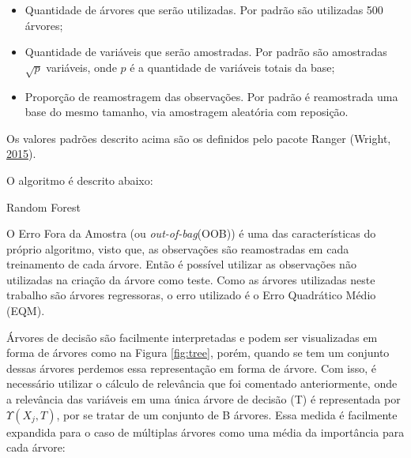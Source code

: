 \documentclass[
	12pt,				%
	a4paper,		%
	oneside,    %
	chapter=TITLE,		   %
	section=TITLE,		   %
	subsection=TITLE,	   %
	subsubsection=TITLE, %
	english,			%
	french,				%
	spanish,			%
	brazil,				%
]{abntex2}
\begin{document}
\begin{itemize}
\item
  Quantidade de árvores que serão utilizadas. Por padrão são utilizadas
  500 árvores;
\item
  Quantidade de variáveis que serão amostradas. Por padrão são
  amostradas \(\sqrt{p}\) variáveis, onde \(p\) é a quantidade de
  variáveis totais da base;
\item
  Proporção de reamostragem das observações. Por padrão é reamostrada
  uma base do mesmo tamanho, via amostragem aleatória com reposição.
\end{itemize}

Os valores padrões descrito acima são os definidos pelo pacote Ranger
(Wright, \protect\hyperlink{ref-wright2015ranger}{2015}).

O algoritmo é descrito abaixo:

\begin{algorithm}[H]

\caption{Random Forest}

\end{algorithm}

O Erro Fora da Amostra (ou \emph{out-of-bag}(OOB)) é uma das
características do próprio algoritmo, visto que, as observações são
reamostradas em cada treinamento de cada árvore. Então é possível
utilizar as observações não utilizadas na criação da árvore como teste.
Como as árvores utilizadas neste trabalho são árvores regressoras, o
erro utilizado é o Erro Quadrático Médio (EQM).

Árvores de decisão são facilmente interpretadas e podem ser visualizadas
em forma de árvores como na Figura \ref{fig:tree}, porém, quando se tem
um conjunto dessas árvores perdemos essa representação em forma de
árvore. Com isso, é necessário utilizar o cálculo de relevância que foi
comentado anteriormente, onde a relevância das variáveis em uma única
árvore de decisão (T) é representada por \(\Upsilon(X_j, T)\), por se
tratar de um conjunto de B árvores. Essa medida é facilmente expandida
para o caso de múltiplas árvores como uma média da importância para cada
árvore:
\end{document}
